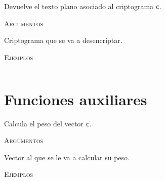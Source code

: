 \begin{description}[leftmargin=1em, font=\normalfont\ttfamily, style=nextline]
\begin{description}[font=\ttfamily, style=nextline]
        \item[decrypt(self, c)] Devuelve el texto plano asociado al criptograma \texttt{c}.

        \textsc{Argumentos}
        \begin{description}[font=\normalfont\ttfamily]
            \item[c] Criptograma que se va a desencriptar.
        \end{description}
        
        \textsc{Ejemplos}
        \begin{lstlisting}[gobble=4]
            % TODO
        \end{lstlisting}
    \end{description}
\end{description}

\section{Funciones auxiliares}

\begin{description}[leftmargin=1em, font=\normalfont\ttfamily, style=nextline]
    \item[get\_weight(c)]
  
    Calcula el peso del vector \texttt{c}.
  
    \textsc{Argumentos}
    \begin{description}[font=\normalfont\ttfamily]
        \item[c] Vector al que se le va a calcular su peso.
    \end{description}

    \textsc{Ejemplos}
    \begin{lstlisting}[gobble=4]
        % TODO
    \end{lstlisting}
\end{description}
